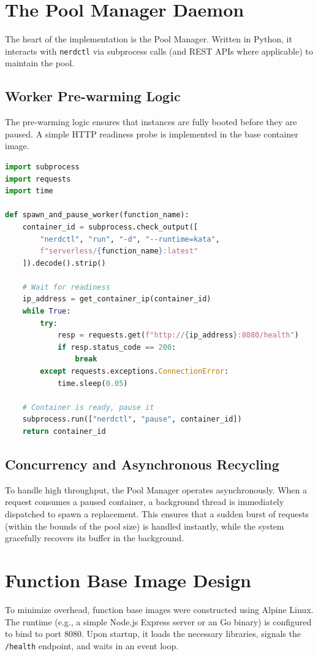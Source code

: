 \documentclass[12pt,a4paper]{report}
\begin{document}
\section{The Pool Manager Daemon}
The heart of the implementation is the Pool Manager. Written in Python, it interacts with \texttt{nerdctl} via subprocess calls (and REST APIs where applicable) to maintain the pool.

\subsection{Worker Pre-warming Logic}
The pre-warming logic ensures that instances are fully booted before they are paused. A simple HTTP readiness probe is implemented in the base container image.

\begin{lstlisting}[language=Python, caption={Simplified Pool Manager Pre-warm Logic}]
import subprocess
import requests
import time

def spawn_and_pause_worker(function_name):
    container_id = subprocess.check_output([
        "nerdctl", "run", "-d", "--runtime=kata",
        f"serverless/{function_name}:latest"
    ]).decode().strip()

    # Wait for readiness
    ip_address = get_container_ip(container_id)
    while True:
        try:
            resp = requests.get(f"http://{ip_address}:8080/health")
            if resp.status_code == 200:
                break
        except requests.exceptions.ConnectionError:
            time.sleep(0.05)

    # Container is ready, pause it
    subprocess.run(["nerdctl", "pause", container_id])
    return container_id
\end{lstlisting}

\subsection{Concurrency and Asynchronous Recycling}
To handle high throughput, the Pool Manager operates asynchronously. When a request consumes a paused container, a background thread is immediately dispatched to spawn a replacement. This ensures that a sudden burst of requests (within the bounds of the pool size) is handled instantly, while the system gracefully recovers its buffer in the background.

\section{Function Base Image Design}
To minimize overhead, function base images were constructed using Alpine Linux. The runtime (e.g., a simple Node.js Express server or an Go binary) is configured to bind to port 8080. Upon startup, it loads the necessary libraries, signals the \texttt{/health} endpoint, and waits in an event loop.
\end{document}
